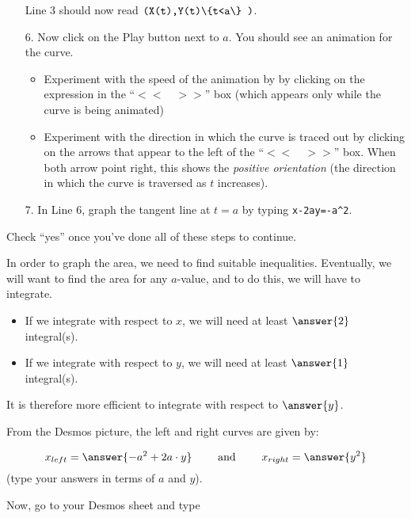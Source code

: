 \documentclass{ximera}
\begin{document}
\begin{exercise}
\begin{itemize}
Line 3 should now read $\verb|(X(t),Y(t)\{t<a\} )|$.

\item[6.] Now click on the Play button next to $a$.  You should see an animation for the curve.  
\begin{itemize}
\item Experiment with the speed of the animation by by clicking on the expression in the ``$<< \quad >>$'' box (which appears only while the curve is being animated)
\item Experiment with the direction in which the curve is traced out by clicking on the arrows that appear to the left of the ``$<< \quad >>$'' box.  When both arrow point right, this shows the \emph{positive orientation} (the direction in which the curve is traversed as $t$ increases).
\end{itemize}

\item[7.] In Line 6, graph the tangent line at $t=a$ by typing \verb|x-2ay=-a^2|.
\end{itemize}

Check ``yes'' once you've done all of these steps to continue.

\begin{multipleChoice}
\end{multipleChoice}

\begin{exercise}
In order to graph the area, we need to find suitable inequalities.  Eventually, we will want to find the area for any $a$-value, and to do this, we will have to integrate.

\begin{itemize}
\item If we integrate with respect to $x$, we will need at least $\answer{2}$ integral(s).
\item If we integrate with respect to $y$, we will need at least $\answer{1}$ integral(s).
\end{itemize}

It is therefore more efficient to integrate with respect to $\answer{y}$.

\begin{exercise}
From the Desmos picture, the left and right curves are given by:

\[
x_{left} = \answer{-a^2+2a \cdot y} \qquad \textrm{ and } \qquad x_{right} = \answer{y^2}
\]
(type your answers in terms of $a$ and $y$).

Now, go to your Desmos sheet and type 


\end{exercise}
\end{exercise}
\end{exercise}
\end{document}
